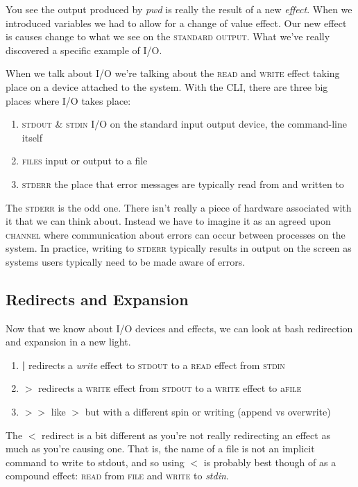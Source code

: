 \documentclass[]{tufte-handout}
\begin{document}
You see the output produced by \textit{pwd} is really the result of a new \textit{effect}. When we introduced variables we had to allow for a change of value effect.  Our new effect is causes change to what we see on the \textsc{standard output}.  What we've really discovered a specific example of \textsc{I/O}. 

When we talk about \textsc{I/O} we're talking about the \textsc{read} and \textsc{write} effect taking place on a device  attached to the system. With the CLI, there are three big places where \textsc{I/O} takes place: 
\begin{enumerate}
\item \textsc{stdout} \& \textsc{stdin}  I/O on the standard input output device, the command-line itself
\item \textsc{files} input or output to a file
\item \textsc{stderr} the place that error messages are typically read from and written to
\end{enumerate}
The \textsc{stderr} is the odd one.  There isn't really a piece of hardware associated with it that we can think about. Instead we have to imagine it as an agreed upon \textsc{channel} where communication about errors can occur between processes on the system. In practice, writing to \textsc{stderr} typically results in output on the screen as systems users typically need to be made aware of errors.  

\subsection{Redirects and Expansion}

Now that we know about \textsc{I/O} devices and effects, we can look at bash redirection and expansion in a new light. 
\begin{enumerate}
\item \textbf{|} redirects a \textit{write} effect to \textsc{stdout} to a \textsc{read} effect from \textsc{stdin} \newline
\item \textbf{$>$} redirects a \textsc{write} effect from \textsc{stdout} to a \textsc{write} effect to a\textsc{file}
\item \textbf{$>>$} like \textit{$>$} but with a different spin or writing (append vs overwrite)
\end{enumerate}
The \textbf{$<$} redirect is a bit different as you're not really redirecting an effect as much as you're causing one.  That is, the name of a file is not an implicit command to write to stdout, and so using $<$ is probably best though of as a compound effect: \textsc{read} from \textsc{file} and \textsc{write} to \textit{stdin}.
\end{document}
